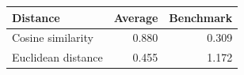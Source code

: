 \begin{tabular}[t]{lrr}
\toprule
Distance & Average & Benchmark \\
\midrule 
Cosine similarity & 0.880 & 0.309 \\
Euclidean distance & 0.455 & 1.172 \\
\bottomrule
\end{tabular}